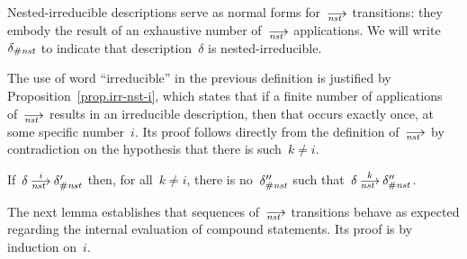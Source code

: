Nested-irreducible descriptions serve as normal forms for~$\nst$
transitions: they embody the result of an exhaustive number of~$\nst$
applications.  We will write~$\delta_{\#\mathit{nst}}$ to indicate that
description~$\delta$ is nested-irreducible.

The use of word ``irreducible'' in the previous definition is justified
by Proposition~\ref{prop.irr-nst-i}, which states that if a finite number
of applications of~$\nst$ results in an irreducible description, then that
occurs exactly once, at some specific number~$i$.  Its proof follows
directly from the definition of~$\nst$ by contradiction on the hypothesis
that there is such~$k\ne{i}$.

\begin{proposition}[label=prop.irr-nst-i,restate=propirrnsti]
  If~$\delta\nst[i]\delta_\Hnst'$ then, for all~$k\ne{i}$, there is
  no~$\delta_{\#\mathit{nst}}''$ such that~$\delta\nst[k]\delta''_\Hnst$.
\end{proposition}

The next lemma establishes that sequences of~$\nst$ transitions behave as
expected regarding the internal evaluation of compound statements.  Its
proof is by induction on~$i$.

